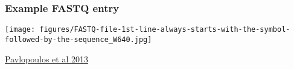 \documentclass{beamer}
\begin{document}
\begin{frame}
  \frametitle{Example FASTQ entry}
\centering
\texttt{[image: figures/FASTQ-file-1st-line-always-starts-with-the-symbol-followed-by-the-sequence\_W640.jpg]}

\href{https://biodatamining.biomedcentral.com/articles/10.1186/1756-0381-6-13}{Pavlopoulos et al 2013}
\end{frame}








\end{document}
